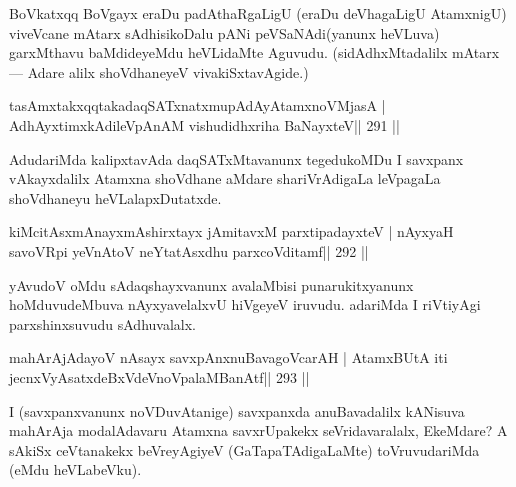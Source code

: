 \begin{artha}
BoVkatxqq BoVgayx eraDu padAthaRgaLigU (eraDu deVhagaLigU AtamxnigU) viveVcane mAtarx sAdhisikoDalu pANi peVSaNAdi(yanunx heVLuva) garxMthavu baMdideyeMdu heVLidaMte Aguvudu. (sidAdhxMtadalilx mAtarx  {\rm ---}  Adare alilx shoVdhaneyeV vivakiSxtavAgide.)
\end{artha}

\begin{shl}
\footnotemark[3]tasAmxtakxqqtakadaqSATxnatxmupAdAyA\s\s tamxnoV\s MjasA |
AdhAyxtimxkAdileVpAnAM vishudidhxriha BaNayxteV\hfill || 291 ||
\end{shl}

\begin{artha}
AdudariMda kalipxtavAda daqSATxMtavanunx tegedukoMDu I savxpanx vAkayxdalilx Atamxna shoVdhane aMdare shariVrAdigaLa leVpagaLa shoVdhaneyu heVLalapxDutatxde.
\end{artha}


\begin{shl}
kiMcitAsxmAnayxmAshirxtayx jAmitavxM parxtipadayxteV |
nAyxyaH savoVR\s pi yeVnAtoV neYtatAsxdhu parxcoVditamf\hfill || 292 ||
\end{shl}

\begin{artha}
yAvudoV oMdu sAdaqshayxvanunx avalaMbisi punarukitxyanunx  hoMduvudeMbuva nAyxyavelalxvU hiVgeyeV iruvudu. adariMda I riVtiyAgi parxshinxsuvudu sAdhuvalalx.
\end{artha}


\begin{shl}
mahArAjAdayoV nAsayx savxpAnxnuBavagoVcarAH |
AtamxBUtA iti jecnxVyAsatxdeBxVdeVnoVpalaMBanAtf\hfill || 293 ||
\end{shl}

\begin{artha}
I (savxpanxvanunx noVDuvAtanige) savxpanxda anuBavadalilx kANisuva mahArAja modalAdavaru Atamxna savxrUpakekx seVridavaralalx, EkeMdare? A sAkiSx ceVtanakekx beVreyAgiyeV (GaTapaTAdigaLaMte) toVruvudariMda (eMdu heVLabeVku).
\end{artha}

